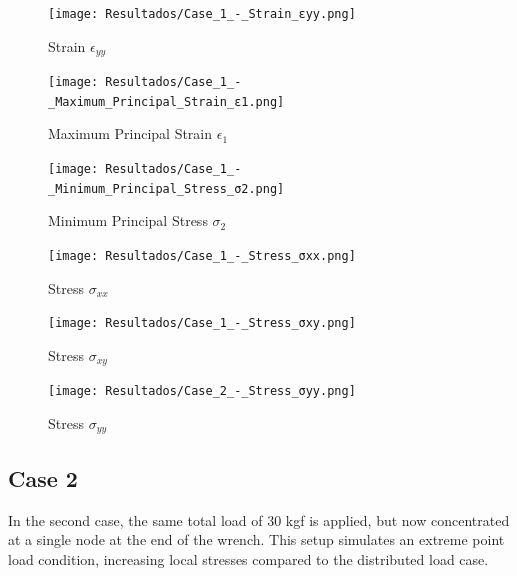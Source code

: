 \documentclass[12pt]{article}
\begin{document}
\begin{figure}[H]
    \centering
    \begin{minipage}{0.48\textwidth}
        \centering
        \texttt{[image: Resultados/Case\_1\_-\_Strain\_εyy.png]}
        \caption{Strain $\epsilon_{yy}$}
        \label{fig:fig6}
    \end{minipage}
    \hfill
    \begin{minipage}{0.48\textwidth}
        \centering
        \texttt{[image: Resultados/Case\_1\_-\_Maximum\_Principal\_Strain\_ε1.png]}
        \caption{Maximum Principal Strain $\epsilon_1$}
        \label{fig:fig7}
    \end{minipage}
\end{figure}

\begin{figure}[H]
    \centering
    \begin{minipage}{0.48\textwidth}
        \centering
        \texttt{[image: Resultados/Case\_1\_-\_Minimum\_Principal\_Stress\_σ2.png]}
        \caption{Minimum Principal Stress $\sigma_2$}
        \label{fig:fig8}
    \end{minipage}
    \hfill
    \begin{minipage}{0.48\textwidth}
        \centering
        \texttt{[image: Resultados/Case\_1\_-\_Stress\_σxx.png]}
        \caption{Stress $\sigma_{xx}$}
        \label{fig:fig9}
    \end{minipage}
\end{figure}

\begin{figure}[H]
    \centering
    \begin{minipage}{0.48\textwidth}
        \centering
        \texttt{[image: Resultados/Case\_1\_-\_Stress\_σxy.png]}
        \caption{Stress $\sigma_{xy}$}
        \label{fig:fig10}
    \end{minipage}
    \hfill
    \begin{minipage}{0.48\textwidth}
        \centering
        \texttt{[image: Resultados/Case\_2\_-\_Stress\_σyy.png]}
        \caption{Stress $\sigma_{yy}$}
        \label{fig:fig11}
    \end{minipage}
\end{figure}

\newpage

\subsection{Case 2}

In the second case, the same total load of 30 kgf is applied, but now concentrated at a single node at the end of the wrench.  
This setup simulates an extreme point load condition, increasing local stresses compared to the distributed load case.
\end{document}
